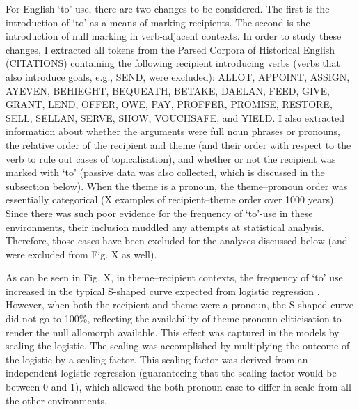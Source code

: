 	For English `to'-use, there are two changes to be considered. The first is the introduction of `to' as a means of marking recipients. The second is the introduction of null marking in verb-adjacent contexts. In order to study these changes, I extracted all tokens from the Parsed Corpora of Historical English (CITATIONS) containing the following recipient introducing verbs (verbs that also introduce goals, e.g., SEND, were excluded): ALLOT, APPOINT, ASSIGN, AYEVEN, BEHIEGHT, BEQUEATH, BETAKE, DAELAN, FEED, GIVE, GRANT, LEND, OFFER, OWE, PAY, PROFFER, PROMISE, RESTORE, SELL, SELLAN, SERVE, SHOW, VOUCHSAFE, and YIELD. I also extracted information about whether the arguments were full noun phrases or pronouns, the relative order of the recipient and theme (and their order with respect to the verb to rule out cases of topicalisation), and whether or not the recipient was marked with `to' (passive data was also collected, which is discussed in the subsection below). When the theme is a pronoun, the theme--pronoun order was essentially categorical (X examples of recipient--theme order over 1000 years). Since there was such poor evidence for the frequency of `to'-use in these environments, their inclusion muddled any attempts at statistical analysis. Therefore, those cases have been excluded for the analyses discussed below (and were excluded from Fig. X as well).

	As can be seen in Fig. X, in theme--recipient contexts, the frequency of `to' use increased in the typical S-shaped curve expected from logistic regression \citep{Kroch.1989}. However, when both the recipient and theme were a pronoun, the S-shaped curve did not go to 100\%, reflecting the availability of theme pronoun cliticisation to render the null allomorph available. This effect was captured in the models by scaling the logistic. The scaling was accomplished by multiplying the outcome of the logistic by a scaling factor. This scaling factor was derived from an independent logistic regression (guaranteeing that the scaling factor would be between 0 and 1), which allowed the both pronoun case to differ in scale from all the other environments.

